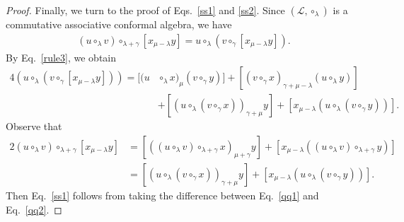 \documentclass[11pt,letterpaper,reqno]{amsart}
\theoremstyle{definition}
\numberwithin{equation}{section}
\begin{document}
\begin{proof}
Finally, we turn to the proof of Eqs.~\eqref{ss1} and \eqref{ss2}. Since $(\mathcal{L} ,\circ_\lambda)$ is a {commutative associative conformal algebra}, we have
   \begin{align*}
        \left(u\circ_{\lambda}v\right)\circ_{\lambda+\gamma}[x_{\mu-\lambda}y]=u\circ_{\lambda}\left(v\circ_{\gamma}[x_{\mu-\lambda}y]\right).
   \end{align*}
By Eq.~\eqref{rule3}, we obtain
   \begin{align}\label{qq1}
      {4}(u\circ_{\lambda}\left(v\circ_{\gamma}[x_{\mu-\lambda}y]\right))=[(u&\circ_{\lambda}x)_{\mu}(v\circ_{\gamma}y)]+[(v\circ_{\gamma}x)_{\gamma+\mu-\lambda}(u\circ_{\lambda}y)] \nonumber\\
      &+[(u\circ_{\lambda}(v\circ_{\gamma}x))_{\gamma+\mu}y]+[x_{\mu-\lambda}(u\circ_{\lambda}(v\circ_{\gamma}y))].
   \end{align}
Observe that
   \begin{align}\label{qq2}
      {2}\left(u\circ_{\lambda}v\right)\circ_{\lambda+\gamma}[x_{\mu-\lambda}y]&=[((u\circ_{\lambda}v)\circ_{\lambda+\gamma}x)_{\mu+\gamma}y]+[x_{\mu-\lambda}((u\circ_{\lambda}v)\circ_{\lambda+\gamma}y)] \nonumber\\
      &=[(u\circ_{\lambda}(v\circ_{\gamma}x))_{\gamma+\mu}y]+[x_{\mu-\lambda}(u\circ_{\lambda}(v\circ_{\gamma}y))].
   \end{align}
Then Eq.~\eqref{ss1} follows from taking the difference between Eq.~\eqref{qq1} and Eq.~\eqref{qq2}.


\end{proof}
\end{document}
